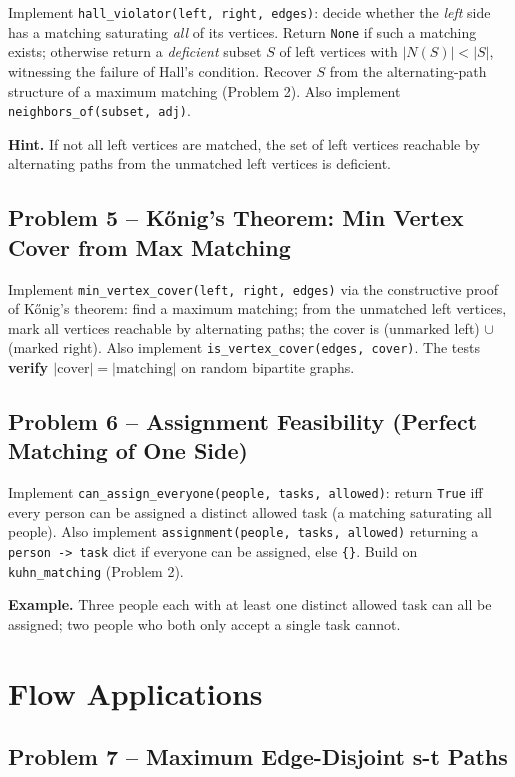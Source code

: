 \documentclass[11pt]{article}
\begin{document}
Implement \texttt{hall\_violator(left, right, edges)}: decide whether the \emph{left}
side has a matching saturating \emph{all} of its vertices. Return \texttt{None} if such a
matching exists; otherwise return a \emph{deficient} subset $S$ of left vertices with
$|N(S)| < |S|$, witnessing the failure of Hall's condition. Recover $S$ from the
alternating-path structure of a maximum matching (Problem 2). Also implement
\texttt{neighbors\_of(subset, adj)}.

\textbf{Hint.} If not all left vertices are matched, the set of left vertices reachable
by alternating paths from the unmatched left vertices is deficient.

\subsection*{Problem 5 -- K\H{o}nig's Theorem: Min Vertex Cover from Max Matching}

Implement \texttt{min\_vertex\_cover(left, right, edges)} via the constructive proof of
K\H{o}nig's theorem: find a maximum matching; from the unmatched left vertices, mark all
vertices reachable by alternating paths; the cover is (unmarked left) $\cup$ (marked
right). Also implement \texttt{is\_vertex\_cover(edges, cover)}. The tests \textbf{verify
$|\text{cover}| = |\text{matching}|$} on random bipartite graphs.

\subsection*{Problem 6 -- Assignment Feasibility (Perfect Matching of One Side)}

Implement \texttt{can\_assign\_everyone(people, tasks, allowed)}: return \texttt{True}
iff every person can be assigned a distinct allowed task (a matching saturating all
people). Also implement \texttt{assignment(people, tasks, allowed)} returning a
\texttt{person -> task} dict if everyone can be assigned, else \texttt{\{\}}. Build on
\texttt{kuhn\_matching} (Problem 2).

\textbf{Example.} Three people each with at least one distinct allowed task can all be
assigned; two people who both only accept a single task cannot.

\newpage
\section{Flow Applications}

\subsection*{Problem 7 -- Maximum Edge-Disjoint s-t Paths}
\end{document}
